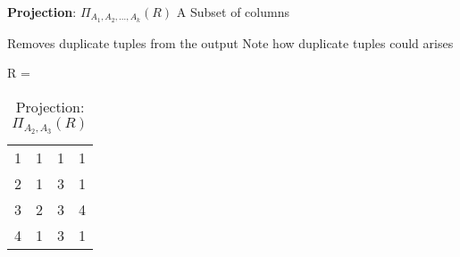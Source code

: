 \documentclass{article}
\begin{document}
\begin{outline}
\begin{example}
\begin{table}[!htb]
\begin{minipage}{.5\linewidth}
\begin{tabular}{|c|c|c|c|}
\end{tabular}
    \end{minipage} 
\end{table}

\end{example}

       
       
       
       
       
       
       
       
       
       
       
       
       
       
       
       
           
           
           
           
           
           
           
           
           
                
                                
        \1 \textbf{Projection}: $\Pi_{A_1, A_2, \dots, A_k}(R)$
                \2 A Subset of columns

                 \2 Removes duplicate tuples from the output
                        \3 Note how duplicate tuples could arises
        
        
        
        
           \begin{example}
           
           
           \begin{table}[!htb]
    \caption{Projection: $\Pi_{A_2, A_3}(R)$ }
    \begin{minipage}{.5\linewidth}
      \centering
     R =    \begin{tabular}{|c|c|c|c|}
   \hline
  \cellcolor{excel}{$A_1$}  & \cellcolor{excel}{$A_2$}  &   \cellcolor{excel}{$A_3$}
&  \cellcolor{excel}{$A_4$}  \\
  \hline
  1 & 1 & 1  &   1 \\
      \hline
  2 & 1 & 3  &   1 \\
      \hline
  3 & 2 & 3  &   4 \\
      \hline
  4 & 1 & 3  &   1 \\
      \hline
   

\end{tabular}
\end{minipage}
\end{table}
\end{example}
\end{outline}
\end{document}
